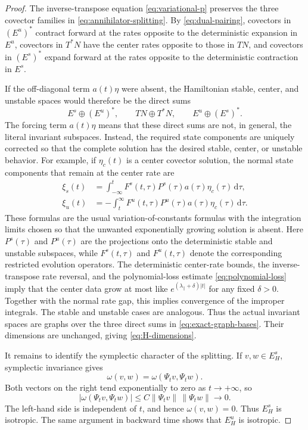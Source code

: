 \documentclass[11pt]{article}
\theoremstyle{definition}
\theoremstyle{remark}
\newcommand{\dd}{\mathrm{d}}
\begin{document}
\begin{proof}
The inverse-transpose equation \eqref{eq:variational-p} preserves the three covector families in \eqref{eq:annihilator-splitting}.  By \eqref{eq:dual-pairing}, covectors in $(E^u)^*$ contract forward at the rates opposite to the deterministic expansion in $E^u$, covectors in $T^*N$ have the center rates opposite to those in $TN$, and covectors in $(E^s)^*$ expand forward at the rates opposite to the deterministic contraction in $E^s$.

If the off-diagonal term $a(t)\eta$ were absent, the Hamiltonian stable, center, and unstable spaces would therefore be the direct sums
\begin{equation}
E^s\oplus(E^u)^*,
\qquad
TN\oplus T^*N,
\qquad
E^u\oplus(E^s)^*.
\label{eq:exact-graph-bases}
\end{equation}
The forcing term $a(t)\eta$ means that these direct sums are not, in general, the literal invariant subspaces.  Instead, the required state components are uniquely corrected so that the complete solution has the desired stable, center, or unstable behavior.  For example, if $\eta_c(t)$ is a center covector solution, the normal state components that remain at the center rate are
\begin{align}
\xi_s(t)&=\int_{-\infty}^{t}F^s(t,\tau)P^s(\tau)a(\tau)\eta_c(\tau)\,\dd\tau,\\
\xi_u(t)&=-\int_t^\infty F^u(t,\tau)P^u(\tau)a(\tau)\eta_c(\tau)\,\dd\tau.
\label{eq:center-normal-corrections}
\end{align}
These formulas are the usual variation-of-constants formulas with the integration limits chosen so that the unwanted exponentially growing solution is absent.  Here $P^s(\tau)$ and $P^u(\tau)$ are the projections onto the deterministic stable and unstable subspaces, while $F^s(t,\tau)$ and $F^u(t,\tau)$ denote the corresponding restricted evolution operators.  The deterministic center-rate bounds, the inverse-transpose rate reversal, and the polynomial-loss estimate \eqref{eq:polynomial-loss} imply that the center data grow at most like $e^{(\lambda_{\parallel}+\delta)|t|}$ for any fixed $\delta>0$.  Together with the normal rate gap, this implies convergence of the improper integrals.  The stable and unstable cases are analogous.  Thus the actual invariant spaces are graphs over the three direct sums in \eqref{eq:exact-graph-bases}.  Their dimensions are unchanged, giving \eqref{eq:H-dimensions}.

It remains to identify the symplectic character of the splitting.  If $v,w\in E_H^s$, symplectic invariance gives
\begin{equation}
\omega(v,w)=\omega(\Psi_tv,\Psi_tw).
\end{equation}
Both vectors on the right tend exponentially to zero as $t\to+\infty$, so
\begin{equation}
|\omega(\Psi_tv,\Psi_tw)|
\le C\|\Psi_tv\|\,\|\Psi_tw\|\longrightarrow0.
\end{equation}
The left-hand side is independent of $t$, and hence $\omega(v,w)=0$.  Thus $E_H^s$ is isotropic.  The same argument in backward time shows that $E_H^u$ is isotropic.


\end{proof}
\end{document}
